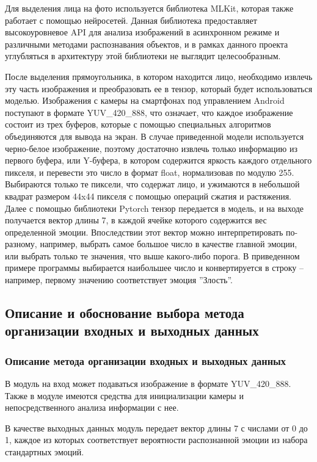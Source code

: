 \documentclass[a4paper,12pt]{article}
\begin{document}
    Для выделения лица на фото используется библиотека MLKit, которая также работает с помощью нейросетей.
    Данная библиотека предоставляет высокоуровневое API для анализа изображений в асинхронном режиме и различными методами распознавания объектов,
    и в рамках данного проекта углубляться в архитектуру этой библиотеки не выглядит целесообразным.

    После выделения прямоугольника, в котором находится лицо, необходимо извлечь эту часть изображения и преобразовать ее в тензор, который будет использоваться моделью.
    Изображения с камеры на смартфонах под управлением Android поступают в формате YUV\_420\_888, что означает, что каждое изображение состоит из трех буферов, которые с помощью специальных алгоритмов объединяются для вывода на экран.
    В случае приведенной модели используется черно-белое изображение, поэтому достаточно извлечь только информацию из первого буфера, или Y-буфера, в котором содержится яркость каждого отдельного пикселя, и перевести это число в формат float, нормализовав по модулю 255.
    Выбираются только те пиксели, что содержат лицо, и ужимаются в небольшой квадрат размером 44x44 пикселя с помощью операций сжатия и растяжения.
    Далее с помощью библиотеки Pytorch тензор передается в модель, и на выходе получается вектор длины 7, в каждой ячейке которого содержится вес определенной эмоции.
    Впоследствии этот вектор можно интерпретировать по-разному, например, выбрать самое большое число в качестве главной эмоции, или выбрать только те значения, что выше какого-либо порога.
    В приведенном примере программы выбирается наибольшее число и конвертируется в строку -- например, первому значению соответствует эмоция ''Злость''.

    \subsection{Описание и обоснование выбора метода организации входных и выходных данных}

    \subsubsection{Описание метода организации входных и выходных данных}

    В модуль на вход может подаваться изображение в формате YUV\_420\_888.
    Также в модуле имеются средства для инициализации камеры и непосредственного анализа информации с нее.

    В качестве выходных данных модуль передает вектор длины 7 с числами от 0 до 1, каждое из которых соответствует вероятности распознанной эмоции из набора стандартных эмоций.
\end{document}
